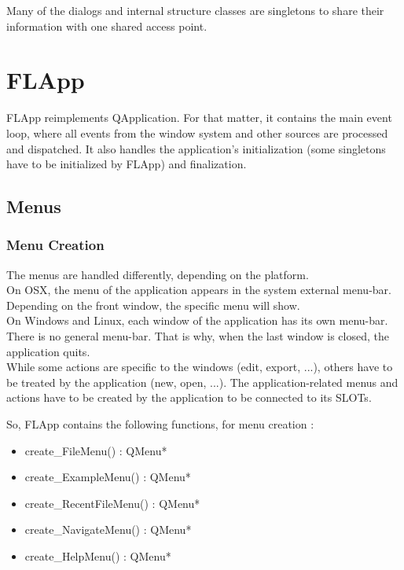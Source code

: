 \documentclass[a4paper]{article}
\begin{document}
Many of the dialogs and internal structure classes are singletons to share their information with one shared access point. 

\section{FLApp}
 
FLApp reimplements QApplication. For that matter, it contains the main event loop, where all events from the window system and other sources are processed and dispatched. It also handles the application's initialization (some singletons have to be initialized by FLApp) and finalization.

\subsection{Menus}

\subsubsection{Menu Creation}

The menus are handled differently, depending on the platform. \\
On OSX, the menu of the application appears in the system external menu-bar. Depending on the front window, the specific menu will show. \\
On Windows and Linux, each window of the application has its own menu-bar. There is no general menu-bar. That is why, when the last window is closed, the application quits. \\

While some actions are specific to the windows (edit, export, ...), others have to be treated by the application (new, open, ...). The application-related menus and actions have to be created by the application to be connected to its SLOTs. 

So, FLApp contains the following functions, for menu creation :
\begin{itemize}
\item create\_FileMenu() : QMenu* 
\item create\_ExampleMenu() : QMenu*
\item create\_RecentFileMenu() : QMenu*
\item create\_NavigateMenu() : QMenu*
\item create\_HelpMenu() : QMenu*
\end{itemize}
\end{document}
